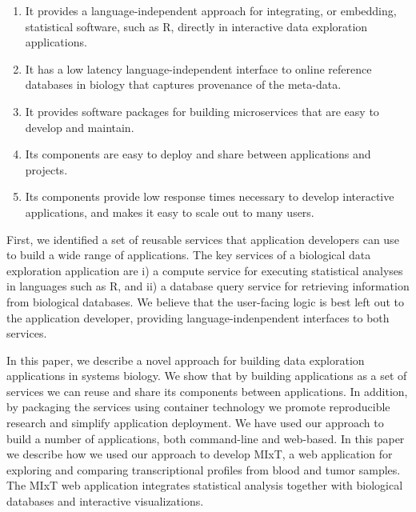 \begin{enumerate}
    \item It provides a language-independent approach for integrating, or
        embedding, statistical software, such as R, directly in 
        interactive data exploration applications.
    \item It has a low latency language-independent interface to online
        reference databases in biology that captures provenance of the
        meta-data. 
    \item It provides software packages for building microservices that are easy
        to develop and maintain. 
    \item Its components are easy to deploy and share between applications and
        projects. 
    \item Its components provide low response times necessary to develop
        interactive applications, and makes it easy to scale out to many users.
\end{enumerate} 

First, we identified a set of reusable services that application developers can
use to build a wide range of applications. The key services of a biological data
exploration application are i) a compute service for executing statistical
analyses in languages such as R, and ii) a database query service for retrieving
information from biological databases. We believe that the user-facing logic is
best left out to the application developer, providing language-indenpendent
interfaces to both services. 

In this paper, we describe a novel approach for building data exploration
applications in systems biology. We show that by building applications as a set
of services we can reuse and share its components between
applications. In addition, by packaging the services using container technology
we promote reproducible research and simplify application deployment. We have
used our approach to build a number of applications, both command-line and
web-based. In this paper we describe how we used our approach to develop MIxT,
a web application for exploring and comparing transcriptional profiles from
blood and tumor samples. The MIxT web application integrates statistical
analysis together with biological databases and interactive visualizations.

